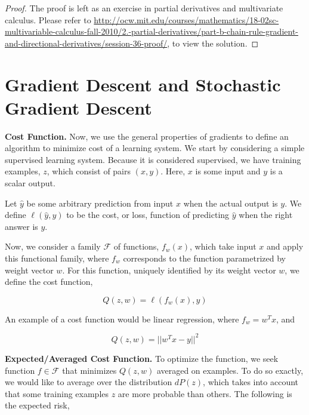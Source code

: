 \documentclass[twoside]{article}
\theoremstyle{definition}
\theoremstyle{definition}
\theoremstyle{remark}
\begin{document}
\begin{proof}
The proof is left as an exercise in partial derivatives and multivariate calculus. Please refer to \url{http://ocw.mit.edu/courses/mathematics/18-02sc-multivariable-calculus-fall-2010/2.-partial-derivatives/part-b-chain-rule-gradient-and-directional-derivatives/session-36-proof/}, to view the solution.
\end{proof}



\section{Gradient Descent and Stochastic Gradient Descent}

\textbf{Cost Function.} Now, we use the general properties of gradients to define an algorithm to minimize cost of a learning system. We start by considering a simple supervised learning system. Because it is considered supervised, we have training examples, $z$, which consist of pairs $(x, y)$. Here, $x$ is some input and $y$ is a scalar output. 

Let $\hat{y}$ be some arbitrary prediction from input $x$ when the actual output is $y$. We define $\ell(\hat{y}, y)$ to be the cost, or loss, function of predicting $\hat{y}$ when the right answer is $y$.

Now, we consider a family $\mathcal{F}$ of functions, $f_w(x)$, which take input $x$ and apply this functional family, where $f_w$ corresponds to the function parametrized by weight vector $w$. For this function, uniquely identified by its weight vector $w$, we define the cost function,

$$Q(z, w) = \ell(f_w(x), y)$$

An example of a cost function would be linear regression, where $f_w = w^T x$, and

$$Q(z, w) = ||w^T x - y||^2$$

\textbf{Expected/Averaged Cost Function.} To optimize the function, we seek function $f \in \mathcal{F}$ that minimizes $Q(z,w)$ averaged on examples. To do so exactly, we would like to average over the distribution $dP(z)$, which takes into account that some training examples $z$ are more probable than others. The following is the expected risk,
\end{document}
